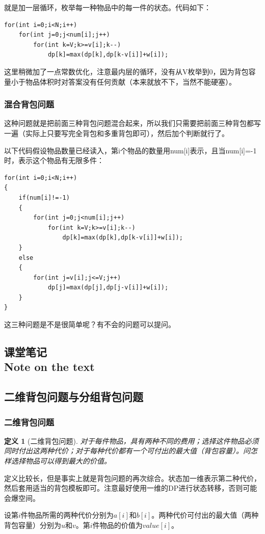 \documentclass{article}
\newtheorem{definition}{定义}[subsection]
\theoremstyle{nonumberplain}
\newcommand{\note}{\ \par
	\subsection*{课堂笔记\\\tiny{Note on the text}}
	\newpage}
\begin{document}
就是加一层循环，枚举每一种物品中的每一件的状态。代码如下：
\begin{verbatim}
for(int i=0;i<N;i++)
    for(int j=0;j<num[i];j++)
        for(int k=V;k>=v[i];k--) 
            dp[k]=max(dp[k],dp[k-v[i]]+w[i]);
\end{verbatim}

这里稍微加了一点常数优化，注意最内层的循环，没有从V枚举到0，因为背包容量小于物品体积时对答案没有任何贡献（本来就放不下，当然不能硬塞）。

\subsubsection{混合背包问题}
这种问题就是把前面三种背包问题混合起来，所以我们只需要把前面三种背包都写一遍（实际上只要写完全背包和多重背包即可），然后加个判断就行了。

以下代码假设物品数量已经读入，第i个物品的数量用num[i]表示，且当num[i]=-1时，表示这个物品有无限多件：
\begin{verbatim}
for(int i=0;i<N;i++)
{
    if(num[i]!=-1)
    {
        for(int j=0;j<num[i];j++)
            for(int k=V;k>=v[i];k--) 
                dp[k]=max(dp[k],dp[k-v[i]]+w[i]);
	}
    else
    {
        for(int j=v[i];j<=V;j++)
            dp[j]=max(dp[j],dp[j-v[i]]+w[i]);
    }
}
\end{verbatim}

这三种问题是不是很简单呢？有不会的问题可以提问。
\note


\newpage
\subsection{二维背包问题与分组背包问题}
\subsubsection{二维背包问题}
\begin{definition}[二维背包问题]对于每件物品，具有两种不同的费用；选择这件物品必须同时付出这两种代价；对于每种代价都有一个可付出的最大值（背包容量）。问怎样选择物品可以得到最大的价值。\end{definition}

定义比较长，但是事实上就是背包问题的再次综合。状态加一维表示第二种代价，然后套用适当的背包模板即可。注意最好使用一维的DP进行状态转移，否则可能会爆空间。


设第$i$件物品所需的两种代价分别为$a[i]$和$b[i]$。两种代价可付出的最大值（两种背包容量）分别为$u$和$v$。第$i$件物品的价值为$value[i]$。
\end{document}

